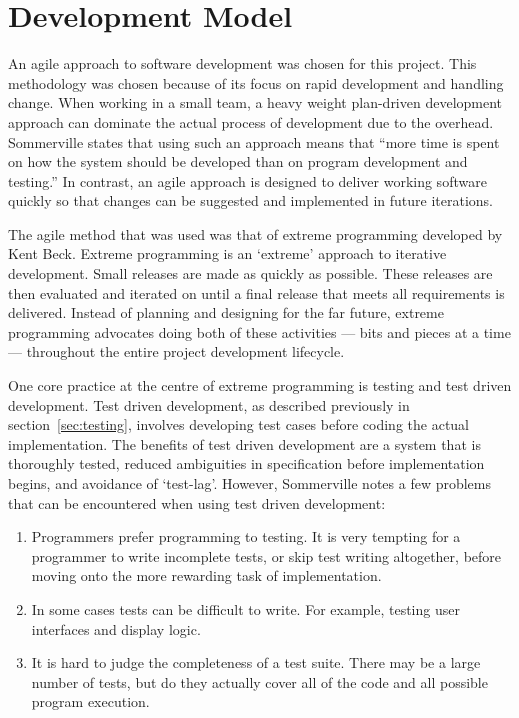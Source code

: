 \section{Development Model}
\label{sec:devmodel}

An agile approach to software development was chosen for this project. This methodology was
chosen because of its focus on rapid development and handling change. When working in a small
team, a heavy weight plan-driven development approach can dominate the actual process of development
due to the overhead. Sommerville states that using such an approach means that ``more time is
spent on how the system should be developed than on program development and testing.''
In contrast, an agile approach is designed to deliver working software quickly so that changes
can be suggested and implemented in future iterations.

The agile method that was used was that of extreme programming developed by Kent Beck.\cite{beck1999}\cite{beck2000}
Extreme programming is an `extreme' approach to iterative development. Small releases are made
as quickly as possible. These releases are then evaluated and iterated on until a final release
that meets all requirements is delivered. Instead of planning and designing for the far future,
extreme programming advocates doing both of these activities --- bits and pieces at a time ---
throughout the entire project development lifecycle.


One core practice at the centre of extreme programming is testing and test driven development.
Test driven development, as described previously in section~\ref{sec:testing}, involves
developing test cases before coding the actual implementation. The benefits of test driven
development are a system that is thoroughly tested, reduced ambiguities in specification before
implementation begins, and avoidance of `test-lag'. However, Sommerville notes a few problems
that can be encountered when using test driven development:

\begin{enumerate}
\item Programmers prefer programming to testing. It is very tempting for a programmer to write
      incomplete tests, or skip test writing altogether, before moving onto the more rewarding
      task of implementation.

\item In some cases tests can be difficult to write. For example, testing user interfaces and
      display logic.

\item It is hard to judge the completeness of a test suite. There may be a large number of tests,
      but do they actually cover all of the code and all possible program execution.
\end{enumerate}

